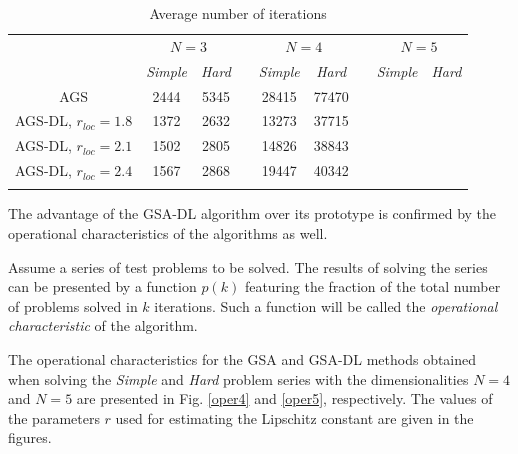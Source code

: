 \documentclass[runningheads]{llncs}
\begin{document}
\begin{table}
	\caption{Average number of iterations}
	\label{tab:1}
	\center
	\begin{tabular}{ccccccccc}
		\hline\noalign{\smallskip}
		 & \multicolumn{2}{c}{$N=3$} & & \multicolumn{2}{c}{$N=4$} & & \multicolumn{2}{c}{$N=5$}  \\
		\noalign{\smallskip} \cline{2-3} \cline{5-6} \cline{8-9} \noalign{\smallskip}
		 & \textit{Simple} & \textit{Hard} & & \textit{Simple} & \textit{Hard} & & \textit{Simple} & \textit{Hard}  \\
		\noalign{\smallskip} \hline \noalign{\smallskip}
									AGS	&	2444	&	5345	& &	28415	&	77470	& &		&		\\
AGS-DL, $r_{loc}=1.8$	&	1372	&	2632	& &	13273	&	37715	& &		&		\\
AGS-DL, $r_{loc}=2.1$	&	1502	&	2805	& &	14826	&	38843	& &		&		\\
AGS-DL, $r_{loc}=2.4$	&	1567	&	2868	& &	19447	&	40342	& &		&		\\
		\noalign{\smallskip}\hline
	\end{tabular}
\end{table}


The advantage of the GSA-DL algorithm over its prototype is confirmed by the operational characteristics of the algorithms as well. 

Assume a series of test problems to be solved. The results of solving the series can be presented by a function $p(k)$ featuring the fraction of the total number of problems solved in $k$ iterations. Such a function will be called the \textit{operational characteristic} of the algorithm. 


The operational characteristics for the GSA and GSA-DL methods obtained when solving the \textit{Simple} and \textit{Hard} problem series with the dimensionalities $N=4$ and $N=5$ are presented in Fig. \ref{oper4} and \ref{oper5}, respectively. The values of the parameters $r$ used for estimating the Lipschitz constant are given in the figures.
\end{document}
